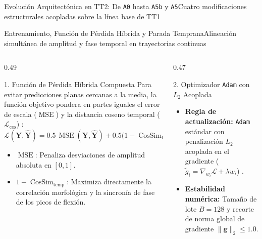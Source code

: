 \begin{frame}{Evoluci\'on Arquitect\'onica en TT2: De \texttt{A0} hasta \texttt{A5b} y \texttt{A5}}{Cuatro modificaciones estructurales acopladas sobre la l\'inea base de TT1 \cite{ronneberger2015unet,rodas_valencia_tpe_ecog}}
\end{frame}

\begin{frame}{Entrenamiento, Funci\'on de P\'erdida H\'ibrida y Parada Temprana}{Alineaci\'on simult\'anea de amplitud y fase temporal en trayectorias continuas \cite{wang2025dtcnet,loshchilov2019decoupled,rodas_valencia_tpe_ecog}}
  \begin{columns}[T,onlytextwidth]
    \begin{column}{0.49\textwidth}
      \begin{block}{1. Funci\'on de P\'erdida H\'ibrida Compuesta}
        \scriptsize
        Para evitar predicciones planas cercanas a la media, la funci\'on objetivo pondera en partes iguales el error de escala ($\operatorname{MSE}$) y la distancia coseno temporal ($\mathcal{L}_{\text{cos}}$) \cite{wang2025dtcnet,Sliwowski2022}:
        \[
          \mathcal{L}(\mathbf{Y}, \hat{\mathbf{Y}}) = 0.5\,\operatorname{MSE}(\mathbf{Y}, \hat{\mathbf{Y}}) + 0.5\big(1 - \operatorname{CosSim}_{\text{temp}}(\mathbf{Y}, \hat{\mathbf{Y}})\big)
        \]
        \begin{itemize}\setlength{\itemsep}{2pt}
          \item $\operatorname{MSE}$: Penaliza desviaciones de amplitud absoluta en $[0,1]$.
          \item $1 - \operatorname{CosSim}_{\text{temp}}$: Maximiza directamente la correlaci\'on morfol\'ogica y la sincron\'ia de fase de los picos de flexi\'on.
        \end{itemize}
      \end{block}
    \end{column}

    \begin{column}{0.47\textwidth}
      \begin{block}{2. Optimizador \texttt{Adam} con $L_2$ Acoplada}
        \scriptsize
        \begin{itemize}\setlength{\itemsep}{3pt}
          \item \textbf{Regla de actualizaci\'on:} \texttt{Adam} est\'andar con penalizaci\'on $L_2$ acoplada en el gradiente ($\tilde{g}_i = \nabla_{w_i}\mathcal{L} + \lambda w_i$) \cite{loshchilov2019decoupled}.
          \item \textbf{Estabilidad num\'erica:} Tama\~no de lote $B=128$ y recorte de norma global de gradiente $\|\mathbf{g}\|_2 \le 1.0$.
        \end{itemize}
      \end{block}


\end{column}
\end{columns}
\end{frame}
